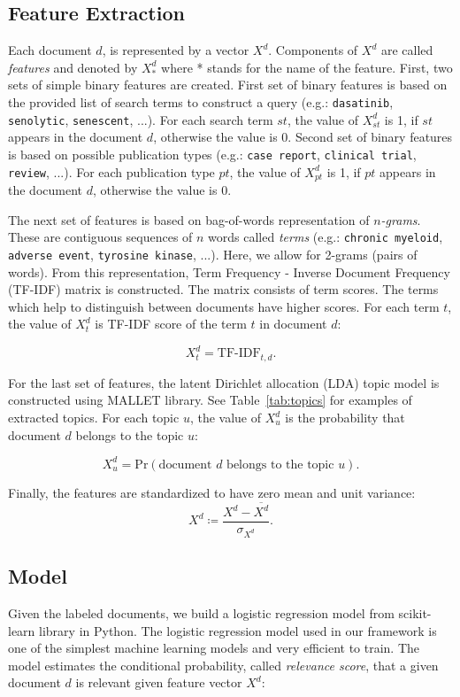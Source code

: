 \documentclass[10pt,twocolumn,letterpaper]{article}
\begin{document}
\subsection{Feature Extraction} 
Each document $d$, is represented by a vector $X^{d}$. Components of $X^{d}$ are called {\it features} and denoted by $X_{*}^{d}$ where * stands for the name of the feature. First, two sets of simple binary features are created. First set of binary features is based on the provided list of search terms to construct a query (e.g.: \texttt{dasatinib}, \texttt{senolytic}, \texttt{senescent}, ...). For each search term $st$, the value of $X_{st}^{d}$ is 1, if $st$ appears in the document $d$, otherwise the value is 0. Second set of binary features is based on possible publication types (e.g.: \texttt{case report}, \texttt{clinical trial}, \texttt{review}, ...). For each publication type $pt$, the value of $X_{pt}^{d}$ is 1, if $pt$ appears in the document $d$, otherwise the value is 0.

The next set of features is based on bag-of-words representation of {\it $n$-grams}. These are contiguous sequences of $n$ words called {\it terms} (e.g.: \texttt{chronic myeloid}, \texttt{adverse event}, \texttt{tyrosine kinase}, ...). Here, we allow for 2-grams (pairs of words). From this representation, Term Frequency - Inverse Document Frequency (TF-IDF) matrix is constructed. The matrix consists of term scores. The terms which help to distinguish between documents have higher scores. For each term $t$, the value of $X_{t}^{d}$ is TF-IDF score of the term $t$ in document $d$:

$$
X_{t}^{d}=\text{TF-IDF}_{t, d}.
$$

For the last set of features, the latent Dirichlet allocation (LDA) topic model is constructed using MALLET library. See Table~\ref{tab:topics} for examples of extracted topics. For each topic $u$, the value of $X_{u}^{d}$ is the probability that document $d$ belongs to the topic $u$:

$$
X_{u}^{d}=\text{Pr}(\text{document $d$ belongs to the topic $u$}).
$$

Finally, the features are standardized to have zero mean and unit variance:
$$
X^{d} \coloneqq \frac{ X^{d} - \overline{X^{d}} }{ \sigma_{X^{d}} }.
$$

\subsection{Model}
Given the labeled documents, we build a logistic regression model from scikit-learn library in Python. The logistic regression model used in our framework is one of the simplest machine learning models and very efficient to train. The model estimates the conditional probability, called {\it relevance score}, that a given document $d$ is relevant given feature vector $X^{d}$:
\end{document}
